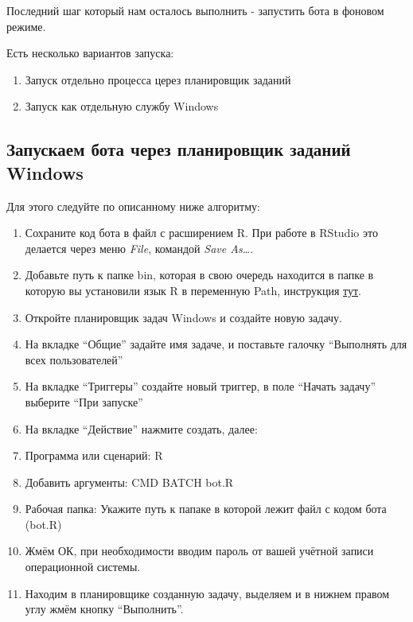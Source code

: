\documentclass[
]{book}
\providecommand{\tightlist}{%
  \setlength{\itemsep}{0pt}\setlength{\parskip}{0pt}}
\begin{document}
Последний шаг который нам осталось выполнить - запустить бота в фоновом режиме.

Есть несколько вариантов запуска:

\begin{enumerate}
\def\labelenumi{\arabic{enumi}.}
\tightlist
\item
  Запуск отдельно процесса церез планировщик заданий
\item
  Запуск как отдельную службу Windows
\end{enumerate}

\subsection{Запускаем бота через планировщик заданий Windows}\label{ux437ux430ux43fux443ux441ux43aux430ux435ux43c-ux431ux43eux442ux430-ux447ux435ux440ux435ux437-ux43fux43bux430ux43dux438ux440ux43eux432ux449ux438ux43a-ux437ux430ux434ux430ux43dux438ux439-windows}

Для этого следуйте по описанному ниже алгоритму:

\begin{enumerate}
\def\labelenumi{\arabic{enumi}.}
\tightlist
\item
  Сохраните код бота в файл с расширением R. При работе в RStudio это делается через меню \emph{File}, командой \emph{Save As\ldots{}}.
\item
  Добавьте путь к папке bin, которая в свою очередь находится в папке в которую вы установили язык R в переменную Path, инструкция \href{https://www.java.com/ru/download/help/path.xml}{тут}.
\item
  Откройте планировщик задач Windows и создайте новую задачу.
\item
  На вкладке ``Общие'' задайте имя задаче, и поставьте галочку ``Выполнять для всех пользователей''
\item
  На вкладке ``Триггеры'' создайте новый триггер, в поле ``Начать задачу'' выберите ``При запуске''
\item
  На вкладке ``Действие'' нажмите создать, далее:
\item
  Программа или сценарий: R
\item
  Добавить аргументы: CMD BATCH bot.R
\item
  Рабочая папка: Укажите путь к папаке в которой лежит файл с кодом бота (bot.R)
\item
  Жмём ОК, при необходимости вводим пароль от вашей учётной записи операционной системы.
\item
  Находим в планировщике созданную задачу, выделяем и в нижнем правом углу жмём кнопку ``Выполнить''.
\end{enumerate}
\end{document}
